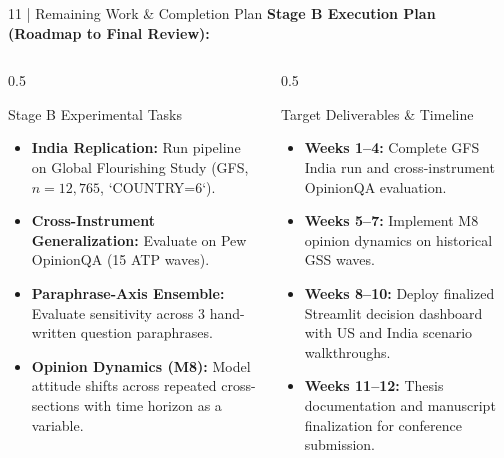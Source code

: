 \documentclass[10pt,aspectratio=169]{beamer}
\begin{document}
\begin{frame}{11 | Remaining Work \& Completion Plan}
    \small
    \textbf{Stage B Execution Plan (Roadmap to Final Review):}

    \vspace{0.15cm}
    \begin{columns}[T]
        \begin{column}{0.5\textwidth}
            \begin{block}{Stage B Experimental Tasks}
                \scriptsize
                \begin{itemize}\itemsep3pt
                    \item \textbf{India Replication:} Run pipeline on Global Flourishing Study (GFS, $n=12{,}765$, `COUNTRY=6`).
                    \item \textbf{Cross-Instrument Generalization:} Evaluate on Pew OpinionQA (15 ATP waves).
                    \item \textbf{Paraphrase-Axis Ensemble:} Evaluate sensitivity across 3 hand-written question paraphrases.
                    \item \textbf{Opinion Dynamics (M8):} Model attitude shifts across repeated cross-sections with time horizon as a variable.
                \end{itemize}
            \end{block}
        \end{column}
        \begin{column}{0.5\textwidth}
            \begin{block}{Target Deliverables \& Timeline}
                \scriptsize
                \begin{itemize}\itemsep3pt
                    \item \textbf{Weeks 1--4:} Complete GFS India run and cross-instrument OpinionQA evaluation.
                    \item \textbf{Weeks 5--7:} Implement M8 opinion dynamics on historical GSS waves.
                    \item \textbf{Weeks 8--10:} Deploy finalized Streamlit decision dashboard with US and India scenario walkthroughs.
                    \item \textbf{Weeks 11--12:} Thesis documentation and manuscript finalization for conference submission.
                \end{itemize}
            \end{block}
        \end{column}
    \end{columns}
\end{frame}
\end{document}

